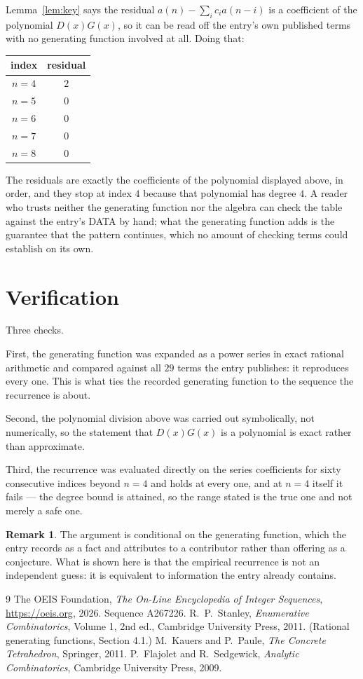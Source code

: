 \documentclass[11pt,a4paper]{article}
\theoremstyle{plain}
\theoremstyle{definition}
\newtheorem{remark}[theorem]{Remark}
\begin{document}
Lemma~\ref{lem:key} says the residual $a(n)-\sum_ic_ia(n-i)$ is a coefficient of the
polynomial $D(x)G(x)$, so it can be read off the entry's own published terms with no
generating function involved at all. Doing that:
\begin{center}
\begin{tabular}{cc}
index & residual \\ \hline
$n=4$ & $2$ \\
$n=5$ & $0$ \\
$n=6$ & $0$ \\
$n=7$ & $0$ \\
$n=8$ & $0$
\end{tabular}
\end{center}
The residuals are exactly the coefficients of the polynomial displayed above, in order, and
they stop at index $4$ because that polynomial has degree $4$. A reader who trusts
neither the generating function nor the algebra can check the table against the entry's DATA
by hand; what the generating function adds is the guarantee that the pattern continues, which
no amount of checking terms could establish on its own.

\section{Verification}

Three checks.

First, the generating function was expanded as a power series in exact rational arithmetic and
compared against all $29$ terms the entry publishes: it reproduces every one. This is
what ties the recorded generating function to the sequence the recurrence is about.

Second, the polynomial division above was carried out symbolically, not numerically, so the
statement that $D(x)G(x)$ is a polynomial is exact rather than approximate.

Third, the recurrence was evaluated directly on the series coefficients for sixty consecutive
indices beyond $n=4$ and holds at every one, and at $n=4$ itself it fails --- the
degree bound is attained, so the range stated is the true one and not merely a safe one.

\begin{remark}
The argument is conditional on the generating function, which the entry records as a fact and
attributes to a contributor rather than offering as a conjecture. What is shown here is that
the empirical recurrence is not an independent guess: it is equivalent to information the
entry already contains.
\end{remark}

\begin{thebibliography}{9}
 The OEIS Foundation, \emph{The On-Line Encyclopedia of Integer
Sequences}, \url{https://oeis.org}, 2026. Sequence A267226.
 R.~P.~Stanley, \emph{Enumerative Combinatorics}, Volume 1, 2nd ed.,
Cambridge University Press, 2011. (Rational generating functions, Section 4.1.)
 M.~Kauers and P.~Paule, \emph{The Concrete Tetrahedron}, Springer, 2011.
 P.~Flajolet and R.~Sedgewick, \emph{Analytic Combinatorics}, Cambridge
University Press, 2009.
\end{thebibliography}
\end{document}
